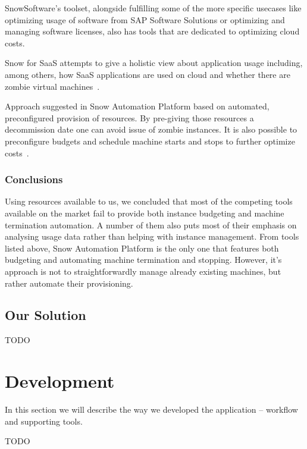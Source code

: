 \documentclass[licencjacka,en]{thesisclass}
\begin{document}
    SnowSoftware's toolset, alongside fulfilling some of the more specific usecases
    like optimizing usage of software from SAP Software Solutions or optimizing and managing software licenses,
    also has tools that are dedicated to optimizing cloud costs.

    Snow for SaaS attempts to give a holistic view about application usage including, among others,
    how SaaS applications are used on cloud and whether there are zombie virtual machines~\cite{SnowSaaS}.

    Approach suggested in Snow Automation Platform based on automated, preconfigured provision of resources.
    By pre-giving those resources a decommission date one can avoid issue of zombie instances.
    It is also possible to preconfigure budgets and schedule machine starts and stops to further optimize costs~\cite{SnowBlog}.

    \subsection{Conclusions}

    Using resources available to us, we concluded that most of the competing tools available on the market
    fail to provide both instance budgeting and machine termination automation.
    A number of them also puts most of their emphasis on analysing usage data rather than
    helping with instance management.
    From tools listed above, Snow Automation Platform is the only one that features both budgeting and automating
    machine termination and stopping.
    However, it's approach is not to straightforwardly manage already existing machines,
    but rather automate their provisioning.

    \section{Our Solution}

    TODO



    \chapter{Development}

    In this section we will describe the way we developed the application -- workflow and supporting tools.

    TODO
\end{document}
